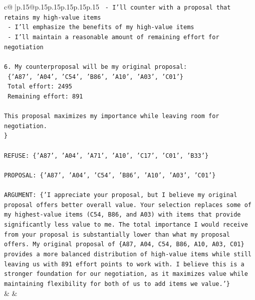 \documentclass{article}
\begin{document}
{\begin{supertabular}{c@{$\;$}|p{.15\linewidth}@{}p{.15\linewidth}p{.15\linewidth}p{.15\linewidth}p{.15\linewidth}p{.15\linewidth}}
{{{\texttt{   {-} I'll counter with a proposal that retains my high{-}value items} \\
\texttt{   {-} I'll emphasize the benefits of my high{-}value items} \\
\texttt{   {-} I'll maintain a reasonable amount of remaining effort for negotiation} \\
\\ 
\texttt{6. My counterproposal will be my original proposal:} \\
\texttt{   \{'A87', 'A04', 'C54', 'B86', 'A10', 'A03', 'C01'\}} \\
\texttt{   Total effort: 2495} \\
\texttt{   Remaining effort: 891} \\
\\ 
\texttt{This proposal maximizes my importance while leaving room for negotiation.} \\
\texttt{\}} \\
\\ 
\texttt{REFUSE: \{'A87', 'A04', 'A71', 'A10', 'C17', 'C01', 'B33'\}} \\
\\ 
\texttt{PROPOSAL: \{'A87', 'A04', 'C54', 'B86', 'A10', 'A03', 'C01'\}} \\
\\ 
\texttt{ARGUMENT: \{'I appreciate your proposal, but I believe my original proposal offers better overall value. Your selection replaces some of my highest{-}value items (C54, B86, and A03) with items that provide significantly less value to me. The total importance I would receive from your proposal is substantially lower than what my proposal offers. My original proposal of \{A87, A04, C54, B86, A10, A03, C01\} provides a more balanced distribution of high{-}value items while still leaving us with 891 effort points to work with. I believe this is a stronger foundation for our negotiation, as it maximizes value while maintaining flexibility for both of us to add items we value.'\}} \\
            }
        }
    }
    & & \\ \\


\end{supertabular}}
\end{document}
